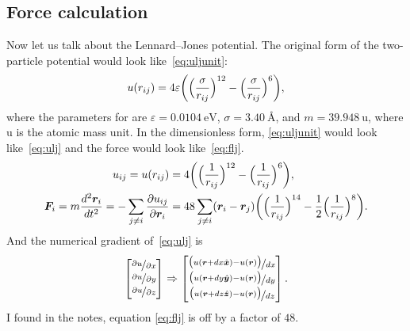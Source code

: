 \subsection{Force calculation}

Now let us talk about the Lennard--Jones potential.
The original form of the two-particle potential would look like~\eqref{eq:uljunit}:
%
\begin{equation}\label{eq:uljunit}
    u(r_{ij}) = 4 \varepsilon \biggl( \Bigl( \frac{ \sigma }{ r_{ij} } \Bigr)^{12}
    -\Bigl( \frac{ \sigma }{ r_{ij} } \Bigr)^6 \biggr),
\end{equation}
%
where the parameters for  are $\varepsilon = \SI{0.0104}{\electronvolt}$,
$\sigma = \SI{3.40}{\angstrom}$, and $m = \SI{39.948}{\atomicmassunit}$, where
$\si{\atomicmassunit}$ is the atomic mass unit.
In the dimensionless form,
\eqref{eq:uljunit} would look like~\eqref{eq:ulj} and the force would
look like~\eqref{eq:flj}.
%
\begin{align}
    u_{ij} = u(r_{ij}) & = 4 \biggl( \Bigl( \frac{ 1 }{ r_{ij} } \Bigr)^{12}
    -\Bigl( \frac{ 1 }{ r_{ij} } \Bigr)^6 \biggr), \label{eq:ulj}            \\
    \bm{F}_i = m\frac{ d^2 \bm{r}_i }{ d t^2 } = -\sum_{j \neq i}\frac{ \partial u_{ij} }{ \partial \bm{r}_i }
                       & = 48\sum_{j \neq i} (\bm{r}_i - \bm{r}_j)
    \biggl( \Bigl( \frac{ 1 }{ r_{ij} } \Bigr)^{14}
    -\frac{ 1 }{ 2 } \Bigl( \frac{ 1 }{ r_{ij} } \Bigr)^8 \biggr). \label{eq:flj}
\end{align}
%
And the numerical gradient of~\eqref{eq:ulj} is
%
\begin{equation}\label{eq:dudr}
    \begin{bmatrix}
        \nicefrac{ \partial u }{ \partial x } \\
        \nicefrac{ \partial u }{ \partial y } \\
        \nicefrac{ \partial u }{ \partial z }
    \end{bmatrix}
    \Rightarrow
    \begin{bmatrix}
        \nicefrac{ \bigl( u(\bm{r} + dx \hat{\bm{x}}) - u(\bm{r}) \bigr) }{ dx } \\
        \nicefrac{ \bigl( u(\bm{r} + dy \hat{\bm{y}}) - u(\bm{r}) \bigr) }{ dy } \\
        \nicefrac{ \bigl( u(\bm{r} + dz \hat{\bm{z}}) - u(\bm{r}) \bigr) }{ dz }
    \end{bmatrix}.
\end{equation}
%
I found in the notes, equation \eqref{eq:flj} is off by a factor of $48$.
